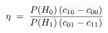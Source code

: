 \documentclass[preview]{standalone}
\begin{document}
\begin{align*}
\special{dvisvgm:raw <g id='unique000'>}\eta \;=\; \frac{P(H_0)\,(c_{10}-c_{00})}{P(H_1)\,(c_{01}-c_{11})}\special{dvisvgm:raw </g>}
\end{align*}
\end{document}
